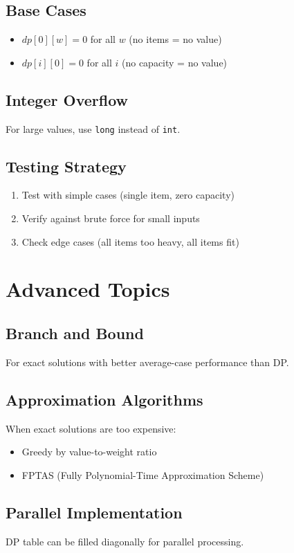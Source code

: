 \documentclass[12pt,a4paper]{article}
\begin{document}
\subsection{Base Cases}
\begin{itemize}
\item $dp[0][w] = 0$ for all $w$ (no items = no value)
\item $dp[i][0] = 0$ for all $i$ (no capacity = no value)
\end{itemize}

\subsection{Integer Overflow}
For large values, use \texttt{long} instead of \texttt{int}.

\subsection{Testing Strategy}
\begin{enumerate}
\item Test with simple cases (single item, zero capacity)
\item Verify against brute force for small inputs
\item Check edge cases (all items too heavy, all items fit)
\end{enumerate}

\section{Advanced Topics}

\subsection{Branch and Bound}
For exact solutions with better average-case performance than DP.

\subsection{Approximation Algorithms}
When exact solutions are too expensive:
\begin{itemize}
\item Greedy by value-to-weight ratio
\item FPTAS (Fully Polynomial-Time Approximation Scheme)
\end{itemize}

\subsection{Parallel Implementation}
DP table can be filled diagonally for parallel processing.
\end{document}
